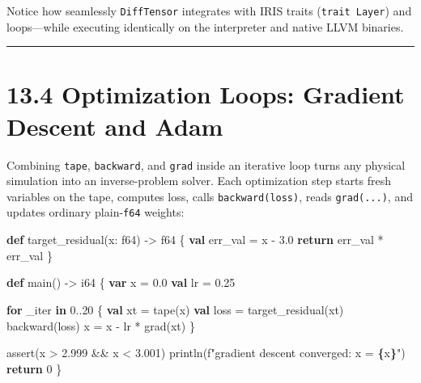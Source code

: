 \documentclass[
  english,
  oneside]{book}
\newenvironment{Shaded}{\begin{snugshade}}{\end{snugshade}}
\newcommand{\ControlFlowTok}[1]{\textcolor[rgb]{0.77,0.53,0.75}{\textbf{#1}}}
\newcommand{\DataTypeTok}[1]{\textcolor[rgb]{0.31,0.79,0.69}{#1}}
\newcommand{\DecValTok}[1]{\textcolor[rgb]{0.71,0.81,0.66}{#1}}
\newcommand{\FloatTok}[1]{\textcolor[rgb]{0.71,0.81,0.66}{#1}}
\newcommand{\FunctionTok}[1]{\textcolor[rgb]{0.86,0.86,0.67}{#1}}
\newcommand{\KeywordTok}[1]{\textcolor[rgb]{0.34,0.61,0.84}{\textbf{#1}}}
\newcommand{\NormalTok}[1]{\textcolor[rgb]{0.83,0.83,0.83}{#1}}
\newcommand{\OperatorTok}[1]{\textcolor[rgb]{0.83,0.83,0.83}{#1}}
\newcommand{\StringTok}[1]{\textcolor[rgb]{0.81,0.57,0.47}{#1}}
\begin{document}
Notice how seamlessly \texttt{DiffTensor} integrates with IRIS traits
(\texttt{trait\ Layer}) and loops---while executing identically on the
interpreter and native LLVM binaries.

\begin{center}\rule{0.5\linewidth}{0.5pt}\end{center}

\section{13.4 Optimization Loops: Gradient Descent and
Adam}\label{optimization-loops-gradient-descent-and-adam}

Combining \texttt{tape}, \texttt{backward}, and \texttt{grad} inside an
iterative loop turns any physical simulation into an inverse-problem
solver. Each optimization step starts fresh variables on the tape,
computes loss, calls \texttt{backward(loss)}, reads \texttt{grad(...)},
and updates ordinary plain-\texttt{f64} weights:

\begin{Shaded}
\begin{Highlighting}[]
\KeywordTok{def}\NormalTok{ target\_residual(x: }\DataTypeTok{f64}\NormalTok{) }\OperatorTok{{-}\textgreater{}} \DataTypeTok{f64}\NormalTok{ \{}
    \KeywordTok{val}\NormalTok{ err\_val }\OperatorTok{=}\NormalTok{ x }\OperatorTok{{-}} \FloatTok{3.0}
    \ControlFlowTok{return}\NormalTok{ err\_val }\OperatorTok{*}\NormalTok{ err\_val}
\NormalTok{\}}

\KeywordTok{def}\NormalTok{ main() }\OperatorTok{{-}\textgreater{}} \DataTypeTok{i64}\NormalTok{ \{}
    \KeywordTok{var}\NormalTok{ x }\OperatorTok{=} \FloatTok{0.0}
    \KeywordTok{val}\NormalTok{ lr }\OperatorTok{=} \FloatTok{0.25}

    \ControlFlowTok{for}\NormalTok{ \_iter }\ControlFlowTok{in} \DecValTok{0}\OperatorTok{..}\DecValTok{20}\NormalTok{ \{}
        \KeywordTok{val}\NormalTok{ xt }\OperatorTok{=}\NormalTok{ tape(x)}
        \KeywordTok{val}\NormalTok{ loss }\OperatorTok{=}\NormalTok{ target\_residual(xt)}
\NormalTok{        backward(loss)}
\NormalTok{        x }\OperatorTok{=}\NormalTok{ x }\OperatorTok{{-}}\NormalTok{ lr }\OperatorTok{*} \DataTypeTok{grad}\NormalTok{(xt)}
\NormalTok{    \}}

    \FunctionTok{assert}\NormalTok{(x }\OperatorTok{\textgreater{}} \FloatTok{2.999} \OperatorTok{\&\&}\NormalTok{ x }\OperatorTok{\textless{}} \FloatTok{3.001}\NormalTok{)}
\NormalTok{    println(}\StringTok{f"gradient descent converged: x = }\ControlFlowTok{\{}\NormalTok{x}\ControlFlowTok{\}}\StringTok{"}\NormalTok{)}
    \ControlFlowTok{return} \DecValTok{0}
\NormalTok{\}}
\end{Highlighting}
\end{Shaded}
\end{document}

